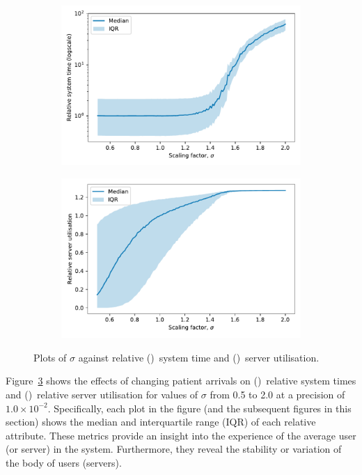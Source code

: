 \documentclass[11pt]{article}
\newlength{\imgwidth}
\begin{document}
\begin{figure}
    \centering
    \begin{subfigure}{.5\imgwidth}
        \includegraphics[width=\linewidth]{img_lambda_time}
        \caption{}\label{fig:lambda_time}
    \end{subfigure}\hfill%
    \begin{subfigure}{.5\imgwidth}
        \includegraphics[width=\linewidth]{img_lambda_util}
        \caption{}\label{fig:lambda_util}
    \end{subfigure}
    \caption{%
        Plots of \(\sigma\) against relative ()~system
        time and ()~server utilisation.
    }\label{fig:lambda}
\end{figure}

Figure~\ref{fig:lambda} shows the effects of changing patient arrivals on
()~relative system times and
()~relative server utilisation for values of \(\sigma\)
from 0.5 to 2.0 at a precision of \(1.0 \times 10^{-2}\). Specifically, each
plot in the figure (and the subsequent figures in this section) shows the median
and interquartile range (IQR) of each relative attribute. These metrics provide
an insight into the experience of the average user (or server) in the system.
Furthermore, they reveal the stability or variation of the body of users
(servers).
\end{document}

